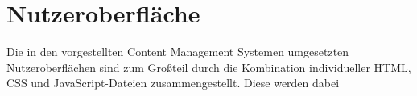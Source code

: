 


\section{Nutzeroberfläche}


Die in den vorgestellten Content Management Systemen umgesetzten Nutzeroberflächen sind zum Großteil durch die Kombination individueller HTML, CSS und JavaScript-Dateien zusammengestellt. Diese werden dabei

